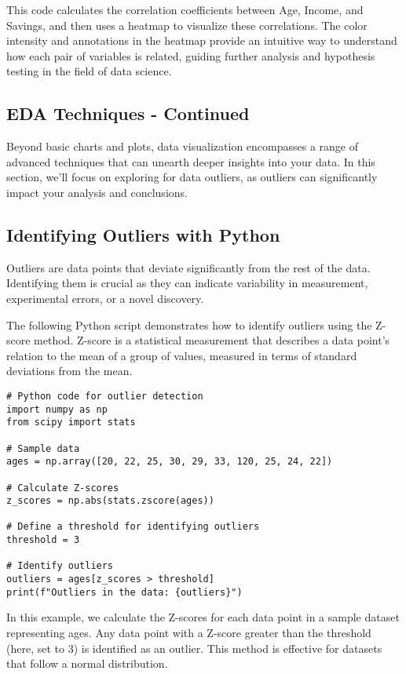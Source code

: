 \documentclass[a4paper,12pt]{book}
\newcounter{example}
\begin{document}
This code calculates the correlation coefficients between Age, Income, and Savings, and then uses a heatmap to visualize these correlations. The color intensity and annotations in the heatmap provide an intuitive way to understand how each pair of variables is related, guiding further analysis and hypothesis testing in the field of data science.

\subsection{EDA Techniques - Continued}
Beyond basic charts and plots, data visualization encompasses a range of advanced techniques that can unearth deeper insights into your data. In this section, we'll focus on exploring for data outliers, as outliers can significantly impact your analysis and conclusions.

\subsection{Identifying Outliers with Python}
Outliers are data points that deviate significantly from the rest of the data. Identifying them is crucial as they can indicate variability in measurement, experimental errors, or a novel discovery.

The following Python script demonstrates how to identify outliers using the Z-score method. Z-score is a statistical measurement that describes a data point's relation to the mean of a group of values, measured in terms of standard deviations from the mean.

\begin{verbatim}
# Python code for outlier detection
import numpy as np
from scipy import stats

# Sample data
ages = np.array([20, 22, 25, 30, 29, 33, 120, 25, 24, 22])

# Calculate Z-scores
z_scores = np.abs(stats.zscore(ages))

# Define a threshold for identifying outliers
threshold = 3

# Identify outliers
outliers = ages[z_scores > threshold]
print(f"Outliers in the data: {outliers}")
\end{verbatim}

In this example, we calculate the Z-scores for each data point in a sample dataset representing ages. Any data point with a Z-score greater than the threshold (here, set to 3) is identified as an outlier. This method is effective for datasets that follow a normal distribution.
\end{document}
